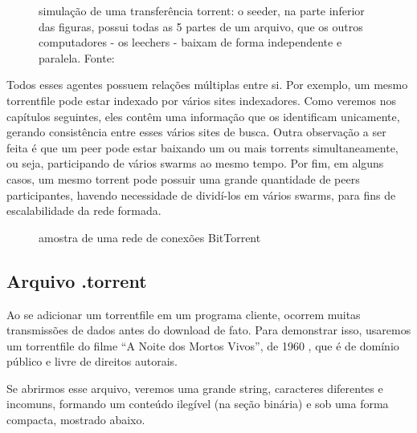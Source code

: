 \begin{figure}[H]
    \vspace{\myvsize}

    \begin{subfigure}[H]{\myhsize}
        \caption{}
        \label{fig:torrent-repr-9}
    \end{subfigure}

    \caption{simulação de uma transferência torrent: o seeder, na parte
    inferior das figuras, possui todas as 5 partes de um arquivo, que os outros
    computadores - os leechers - baixam de forma independente e paralela. Fonte:
    \cite{fig:torrent-dl}}
    \label{fig:torrent-repr}
\end{figure}

Todos esses agentes possuem relações múltiplas entre si. Por exemplo, um mesmo
\gls*{torrentfile} pode estar indexado por vários sites indexadores. Como veremos
nos capítulos seguintes, eles contêm uma informação que os identificam unicamente,
gerando consistência entre esses vários sites de busca. Outra observação a ser feita é
que um \gls*{peer} pode estar baixando um ou mais \glspl*{torrent} simultaneamente, ou
seja, participando de vários \glspl*{swarm} ao mesmo tempo. Por fim, em alguns casos,
um mesmo \gls*{torrent} pode possuir uma grande quantidade de \glspl*{peer}
participantes, havendo necessidade de dividí-los em vários \glspl*{swarm}, para fins de
escalabilidade da rede formada.

\begin{figure}[H]
    \centering
    \caption{amostra de uma rede de conexões BitTorrent}
    \label{fig:torrent-universo}
\end{figure}

\newpage
\subsection*{Arquivo .torrent}

Ao se adicionar um \gls*{torrentfile} em um programa cliente, ocorrem muitas
transmissões de dados antes do download de fato. Para demonstrar isso, usaremos um
\gls*{torrentfile} do filme ``A Noite dos Mortos Vivos'', de 1960 \cite{torrent-file},
que é de domínio público e livre de direitos autorais.

Se abrirmos esse arquivo, veremos uma grande \gls{string}, caracteres diferentes e
incomuns, formando um conteúdo ilegível (na seção binária) e sob uma forma compacta,
mostrado abaixo.

